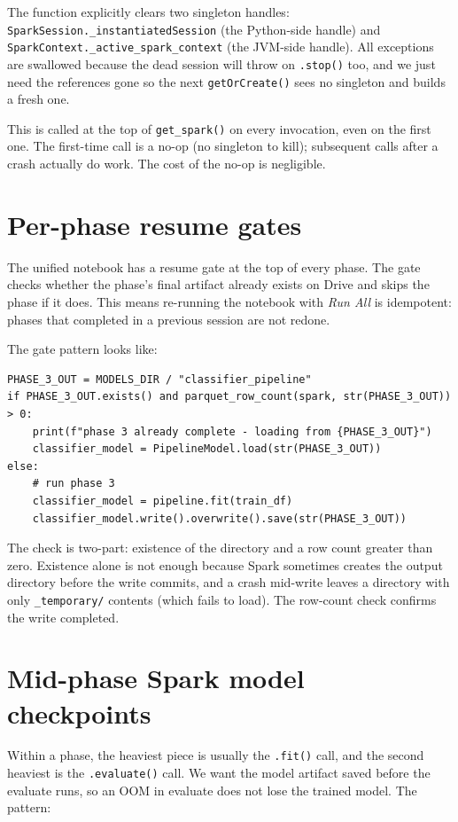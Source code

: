 \documentclass[11pt,letterpaper]{book}
\begin{document}
The function explicitly clears two singleton handles: \texttt{SparkSession.\_instantiatedSession} (the Python-side handle) and \texttt{SparkContext.\_active\_spark\_context} (the JVM-side handle). All exceptions are swallowed because the dead session will throw on \texttt{.stop()} too, and we just need the references gone so the next \texttt{getOrCreate()} sees no singleton and builds a fresh one.

This is called at the top of \texttt{get\_spark()} on every invocation, even on the first one. The first-time call is a no-op (no singleton to kill); subsequent calls after a crash actually do work. The cost of the no-op is negligible.

\section{Per-phase resume gates}

The unified notebook has a resume gate at the top of every phase. The gate checks whether the phase's final artifact already exists on Drive and skips the phase if it does. This means re-running the notebook with \emph{Run All} is idempotent: phases that completed in a previous session are not redone.

The gate pattern looks like:
\begin{lstlisting}
PHASE_3_OUT = MODELS_DIR / "classifier_pipeline"
if PHASE_3_OUT.exists() and parquet_row_count(spark, str(PHASE_3_OUT)) > 0:
    print(f"phase 3 already complete - loading from {PHASE_3_OUT}")
    classifier_model = PipelineModel.load(str(PHASE_3_OUT))
else:
    # run phase 3
    classifier_model = pipeline.fit(train_df)
    classifier_model.write().overwrite().save(str(PHASE_3_OUT))
\end{lstlisting}

The check is two-part: existence of the directory and a row count greater than zero. Existence alone is not enough because Spark sometimes creates the output directory before the write commits, and a crash mid-write leaves a directory with only \texttt{\_temporary/} contents (which fails to load). The row-count check confirms the write completed.

\section{Mid-phase Spark model checkpoints}

Within a phase, the heaviest piece is usually the \texttt{.fit()} call, and the second heaviest is the \texttt{.evaluate()} call. We want the model artifact saved before the evaluate runs, so an OOM in evaluate does not lose the trained model. The pattern:
\end{document}
